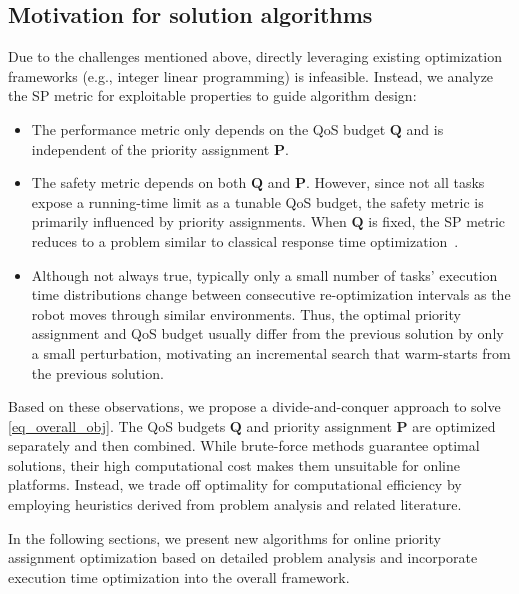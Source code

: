 	\subsection{Motivation for solution algorithms}
    Due to the challenges mentioned above, directly leveraging existing optimization frameworks (e.g., integer linear programming) is infeasible.
    Instead, we analyze the SP metric for exploitable properties to guide algorithm design:
	\begin{itemize}
		\item The performance metric only depends on the QoS budget $\boldsymbol{Q}$ and is independent of the priority assignment $\boldsymbol{P}$.
		\item The safety metric depends on both $\boldsymbol{Q}$ and $\boldsymbol{P}$.
        However, since not all tasks expose a running-time limit as a tunable QoS budget, the safety metric is primarily influenced by priority assignments.
        When $\boldsymbol{Q}$ is fixed, the SP metric reduces to a problem similar to classical response time optimization~\cite{Zhao2020AnOF, Wang2023RTAS}.
		\item Although not always true, typically only a small number of tasks' execution time distributions change between consecutive re-optimization intervals as the robot moves through similar environments.
        Thus, the optimal priority assignment and QoS budget usually differ from the previous solution by only a small perturbation, motivating an incremental search that warm-starts from the previous solution.
	\end{itemize}
    Based on these observations, we propose a divide-and-conquer approach to solve \eqref{eq_overall_obj}.
    The QoS budgets $\boldsymbol{Q}$ and priority assignment $\boldsymbol{P}$ are optimized separately and then combined.
    While brute-force methods guarantee optimal solutions, their high computational cost makes them unsuitable for online platforms.
    Instead, we trade off optimality for computational efficiency by employing heuristics derived from problem analysis and related literature.

    In the following sections, we present new algorithms for online priority assignment optimization based on detailed problem analysis and incorporate execution time optimization into the overall framework.
